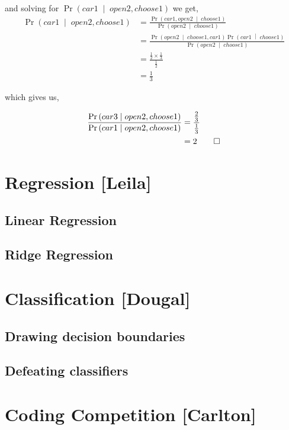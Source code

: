\documentclass[letterpaper,10pt]{article} %
\newcommand{\pipe}{\;\middle\vert\;}
\newcommand{\condp}[2]{\Pr\left( #1 \pipe #2 \right)}
\newcommand{\pr}[1]{\Pr\left( #1 \right)}
\newcommand{\prove}[1]{
\begin{Proof}
\begin{align*}
#1
\end{align*}
\end{Proof}
}
\begin{document}
and solving for $\pr{car1 \pipe open2, choose1}$ we get,
\begin{align*}
 \pr{car1 \pipe open2, choose1} &= \frac{\condp{car1, open2}{choose1}}{\condp{open2}{choose1}}\\
 &=\frac{\condp{open2}{choose1,car1}\condp{car1}{choose1}}{\condp{open2}{choose1}} \\
 &=\frac{\tfrac{1}{2} \times \tfrac{1}{3}}{\tfrac{1}{2}} \\
 &=\tfrac{1}{3}
\end{align*}

which gives us,

\prove{
  \frac{\pr{car3 \pipe open2, choose1}}{\pr{car1 \pipe open2, choose1}} &= \frac{\tfrac{2}{3}}{\tfrac{1}{3}} \\
  &= 2 \qedhere
}

\newpage
\section{Regression [Leila]}
\subsection{Linear Regression}
\subsection{Ridge Regression}
\newpage
\section{Classification [Dougal]}
\subsection{Drawing decision boundaries}
\subsection{Defeating classifiers}

\newpage
\section{Coding Competition [Carlton]}


%
%

\end{document}
